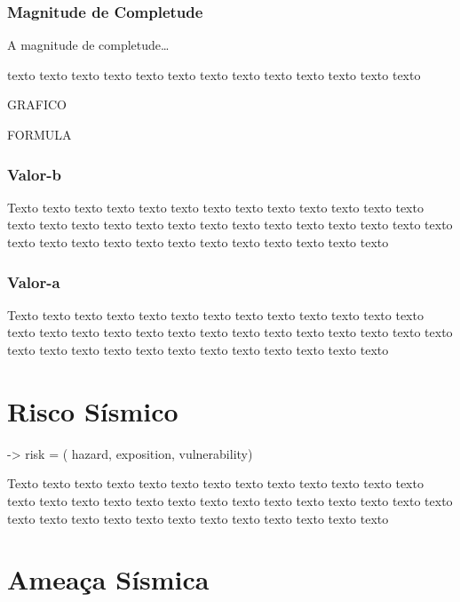 \subsubsection{Magnitude de Completude}
\label{sec:risco_sismico}

A magnitude de completude\ldots 

texto texto texto texto texto texto texto texto texto texto texto texto texto


GRAFICO

FORMULA



\subsubsection{Valor-b}
\label{sec:risco_sismico}


Texto texto texto texto texto texto texto texto texto texto texto texto texto
texto texto texto texto texto texto texto texto texto texto texto texto texto
texto texto texto texto texto texto texto texto texto texto texto texto texto


\subsubsection{Valor-a}
\label{sec:risco_sismico}



Texto texto texto texto texto texto texto texto texto texto texto texto texto
texto texto texto texto texto texto texto texto texto texto texto texto texto
texto texto texto texto texto texto texto texto texto texto texto texto texto




\section{Risco Sísmico}
\label{sec:risco_sismico}

-> risk = ( hazard, 
			exposition, 
			vulnerability)


Texto texto texto texto texto texto texto texto texto texto texto texto texto
texto texto texto texto texto texto texto texto texto texto texto texto texto
texto texto texto texto texto texto texto texto texto texto texto texto texto



\section{Ameaça Sísmica}
\label{sec:ameaca_sismica}

